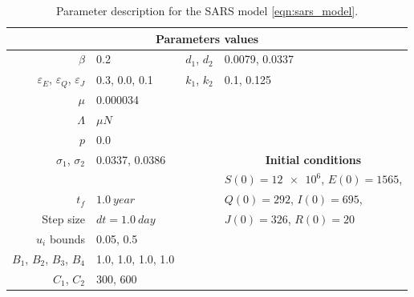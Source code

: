 \begin{table}[H]
    \begin{center}
      \begin{tabular}{@{}rlrl@{}}
        \toprule
        \multicolumn{4}{c}{\bf{Parameters values}}
        \\
        \midrule
        $\beta$
          & \num{0.2}
          & $d_1$, $d_2$
          & \num{0.0079}, \num{0.0337}
        \\
        $\varepsilon_E$, 
        $\varepsilon_Q$,
        $\varepsilon_J$
          & \num{0.3}, \num{0.0}, \num{0.1}
          &
          $k_1$, $k_2$ 
          & 
            \num{0.1},
            \num{0.125}
          \\
        $\mu$
          & \num{0.000034}
        \\
        $\Lambda$
          & $\mu N$
        \\
        $p$
          & \num{0.0}
        \\
        $\sigma_1$, $\sigma_2$
          & \num{0.0337}, \num{0.0386}
          && \multicolumn{1}{c}{\bf{Initial conditions}}
        \\
        \cmidrule{4-4}
          &&& $S(0)=\num{12e6}$, $E(0)=1565$,
         \\
        $t_f$
          & $\SI{1.0}{year}$
          && $Q(0)=292$, $I(0)=\num{695}$,
        \\
        Step size
        & $dt=\SI{1.0}{day}$
        && $J(0)=\num{326}$, $R(0)=\num{20}$
        \\
        $u_i$ bounds
          & \num{.05}, \num{0.5}
        \\
        $B_1$, $B_2$, $B_3$, $B_4$
        & \num{1.0}, \num{1.0}, \num{1.0}, \num{1.0}
        \\
        $C_1$, $C_2$
        & \num{300}, \num{600}
        \\
        \bottomrule
      \end{tabular}
     \caption{Parameter description for the SARS model
     \eqref{eqn:sars_model}.}
     \label{tbl:sars_table}
     \end{center}
\end{table}


